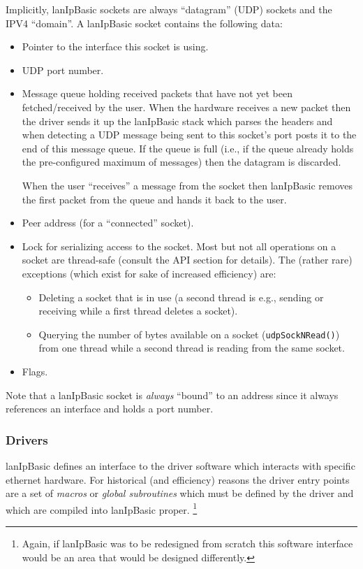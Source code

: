 \documentclass{article}
\newcommand{\lip}{lanIpBasic}
\newcommand{\ethn}{ethernet}
\newcommand{\lipc}[1]{{\tt #1}}
\begin{document}
Implicitly, \lip{} sockets are always ``datagram'' (UDP) sockets
and the IPV4 ``domain''. A \lip{} socket contains the following
data:
\begin{itemize}
\item Pointer to the interface this socket is using.
\item UDP port number.
\item Message queue holding received packets that have not yet been
      fetched/received by the user. When the hardware receives a new
      packet then the driver sends it up the \lip{} stack which parses
      the headers and when detecting a UDP message being sent to this
      socket's port posts it to the end of this message queue. If the
      queue is full (i.e., if the queue already holds the pre-configured
      maximum of messages) then the datagram is discarded.

      When the user ``receives'' a message from the socket then
      \lip{} removes the first packet from the queue and hands
      it back to the user.
\item Peer address (for a ``connected'' socket).
\item Lock for serializing access to the socket. Most but not all
      operations on a socket are thread-safe (consult the API section
      for details). The (rather rare) exceptions
      (which exist for sake of increased efficiency) are:
      \begin{itemize}
        \item Deleting a socket that is in use (a second thread is
              e.g., sending or receiving while a first thread deletes
              a socket).
        \item Querying the number of bytes available on a socket
              (\lipc{udpSockNRead()})
              from one thread while a second thread is reading from
              the same socket.
      \end{itemize}
\item Flags.
\end{itemize}
Note that a \lip{} socket is {\em always} ``bound'' to an address since
it always references an interface and holds a port number.

    \subsubsection{Drivers}
\lip{} defines an interface to the driver software
which interacts with specific \ethn{} hardware.
For historical (and efficiency) reasons the driver entry points are
a set of {\em macros} or {\em global subroutines}
which must be defined by the
driver and which are compiled into \lip{} proper.%
\footnote{
Again, if \lip{} was to be redesigned from scratch
this software interface would be an area that would be designed
differently.}
\end{document}

